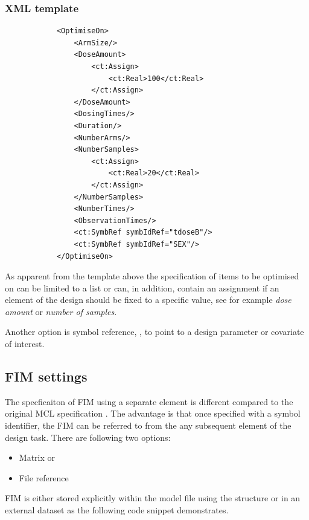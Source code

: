 \subsubsection{XML template}
\lstset{language=XML}
\begin{lstlisting}
            <OptimiseOn>
                <ArmSize/>
                <DoseAmount>
                    <ct:Assign>
                        <ct:Real>100</ct:Real>
                    </ct:Assign>
                </DoseAmount>
                <DosingTimes/>
                <Duration/>
                <NumberArms/>
                <NumberSamples>
                    <ct:Assign>
                        <ct:Real>20</ct:Real>
                    </ct:Assign>
                </NumberSamples>
                <NumberTimes/>
                <ObservationTimes/>
                <ct:SymbRef symbIdRef="tdoseB"/>
                <ct:SymbRef symbIdRef="SEX"/>
            </OptimiseOn>
\end{lstlisting}

As apparent from the template above the specification of items to 
be optimised on can be limited to a list or can, in addition, contain an
assignment if an element of the design should be fixed to a specific
value, see for example \emph{dose amount} or \emph{number of 
samples}.

Another option is symbol reference, , to point to a design 
parameter or covariate of interest.
\newline

\subsection{FIM settings}
The specficaiton of FIM using a separate element is different compared to the 
original MCL specification \cite{Commets2015, CommetsExamples2015}.
The advantage is that once specified with a symbol identifier, the FIM can be 
referred to from the any subsequent element of the design task. There are following 
two options:
\begin{itemize}
\item 
Matrix or
\item 
File reference
\end{itemize}
FIM is either stored explicitly within the model file using the  structure 
or in an external dataset as the following code snippet demonstrates.
